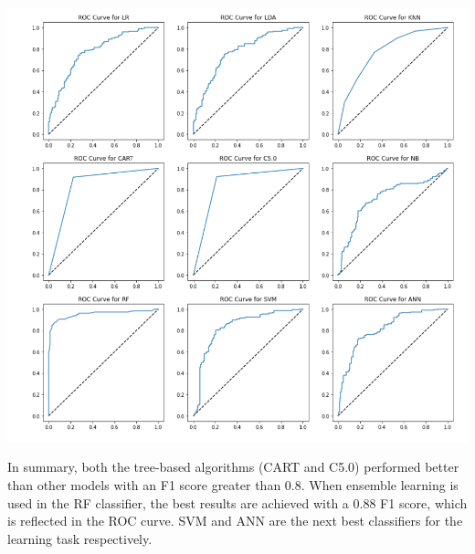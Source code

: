 \documentclass[a4paper, 12pt]{article}
\begin{document}
\begin{center}
\includegraphics[scale=0.7]{roc.png}
\label{fig:roc}
\end{center}

\noindent In summary, both the tree-based algorithms (CART and C5.0) performed better than other models with an F1 score greater than 0.8. When ensemble learning is used in the RF classifier, the best results are achieved with a 0.88 F1 score, which is reflected in the ROC curve. SVM and ANN are the next best classifiers for the learning task respectively.

\newpage
\end{document}
